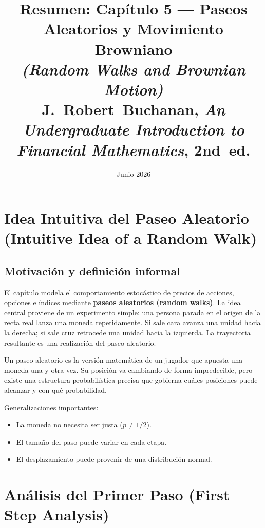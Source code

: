 \documentclass[12pt]{article}
\title{\textbf{Resumen: Cap\'itulo 5 --- Paseos Aleatorios y Movimiento Browniano}\\
\large \textit{(Random Walks and Brownian Motion)}\\
\normalsize J.~Robert~Buchanan, \textit{An Undergraduate Introduction to Financial Mathematics}, 2nd~ed.}
\author{}
\date{Junio 2026}
\begin{document}
\maketitle
\tableofcontents
\newpage

\section{Idea Intuitiva del Paseo Aleatorio (Intuitive Idea of a Random Walk)}

\subsection{Motivaci\'on y definici\'on informal}

El cap\'itulo modela el comportamiento estoc\'astico de precios de acciones, opciones
e \'indices mediante \textbf{paseos aleatorios (random walks)}.
La idea central proviene de un experimento simple: una persona parada en el origen
de la recta real lanza una moneda repetidamente. Si sale cara avanza una unidad
hacia la derecha; si sale cruz retrocede una unidad hacia la izquierda.
La trayectoria resultante es una realizaci\'on del paseo aleatorio.

\begin{intuicion}
Un paseo aleatorio es la versi\'on matem\'atica de un jugador que apuesta una moneda
una y otra vez. Su posici\'on va cambiando de forma impredecible,
pero existe una estructura probabil\'istica precisa que gobierna cu\'ales posiciones
puede alcanzar y con qu\'e probabilidad.
\end{intuicion}

Generalizaciones importantes:
\begin{itemize}
  \item La moneda no necesita ser justa ($p \neq 1/2$).
  \item El tama\~no del paso puede variar en cada etapa.
  \item El desplazamiento puede provenir de una distribuci\'on normal.
\end{itemize}

\section{An\'alisis del Primer Paso (First Step Analysis)}
\end{document}
